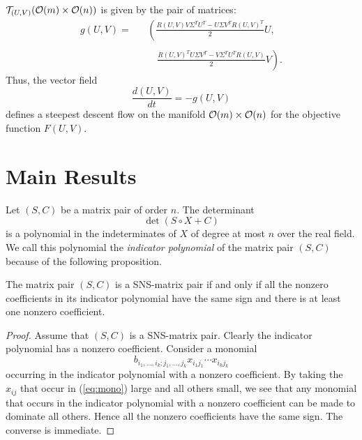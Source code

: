 \documentclass{SIAMGHbook2016}
\begin{document}
${\cal T}_{(U,V)}({\cal O} (m) \times {\cal O} (n))$  is given by the pair of
matrices:
\begin{eqnarray}
g(U,V) = && \left( \frac{R(U,V)V\Sigma^{T}U^{T}-U\Sigma V^{T}R(U,V)^{T}}{2}U,
\right.			\nonumber \\[-1.5ex]
\label{eq2.14}\\[-1.5ex]
&&\quad \left. \frac{R(U,V)^{T}U\Sigma V^{T}-V
   \Sigma^{T}U^{T}R(U,V)}{2}V \right).\nonumber
\end{eqnarray}
Thus, the vector field
\begin{equation}
\frac{d(U,V)}{dt} = -g(U,V) 	\label{eq2.15}
\end{equation}
defines a steepest descent flow on the manifold  ${\cal O} (m) \times
{\cal O} (n)$ for the objective function  $F(U,V)$.

\section{Main Results}

Let $(S,C)$ be a matrix pair of order $n$.  The determinant
\[\det (S\circ X+C)\]
is a polynomial in the indeterminates of $X$ of degree at
most $n$ over the real field. We call this polynomial the
{\em indicator polynomial} of the matrix pair $(S,C)$
because of the following proposition.

\begin{theorem}
\label{th:prop}
The matrix pair $(S,C)$ is a {\rm SNS}-matrix pair if and
only if all the nonzero coefficients in its indicator
polynomial have the same sign and there is at least one
nonzero coefficient.
\end{theorem}

\begin{proof}
Assume that $(S,C)$ is a SNS-matrix pair.  Clearly the
indicator polynomial has a nonzero coefficient.  Consider a
monomial
\begin{equation}
\label{eq:mono}
b_{i_{1},\ldots,i_{k};j_{1},\ldots,j_{k}}x_{i_{1}j_{1}}\cdots
x_{i_{k}j_{k}}
\end{equation}
occurring in the indicator polynomial with a nonzero
coefficient.  By taking the $x_{ij}$ that occur in
(\ref{eq:mono}) large and all others small, we see that any
monomial that occurs in the indicator polynomial with a
nonzero coefficient can be made to dominate all others.
Hence all the nonzero coefficients have the same sign. The
converse is immediate. \qquad\end{proof}
\end{document}
